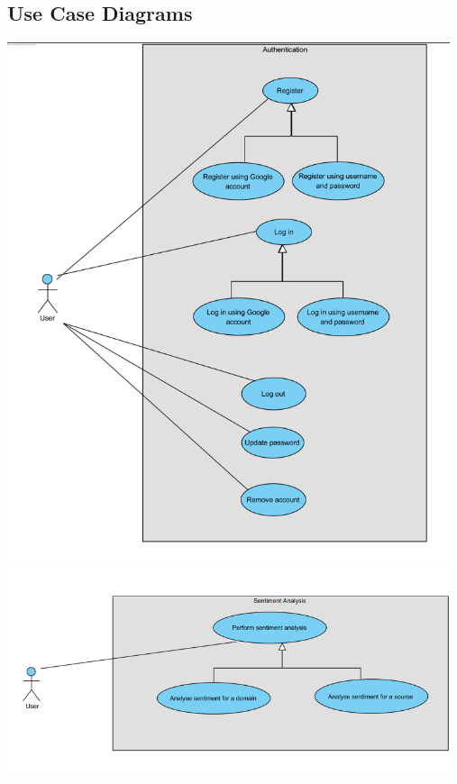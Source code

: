 \documentclass[12pt]{article}
\begin{document}
\subsection{Use Case Diagrams}
\begin{center}
    \includegraphics[width=13cm]{../../Images/uc1.1.png}
    \includegraphics[width=13cm]{../../Images/uc1.2.png}

\end{center}
\end{document}
